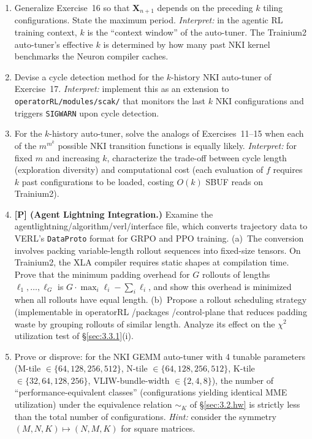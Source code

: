 \documentclass[12pt]{article}
\newcommand{\SBUF}{\textsc{SBUF}}                 %
\newcommand{\MME}{\textsc{MME}}                   %
\begin{document}
\begin{enumerate}
\item[\textbf{17.}] [10] Generalize Exercise~16 so that $\mathbf{X}_{n+1}$ depends on the preceding $k$ tiling configurations. State the maximum period. \emph{Interpret:} in the agentic RL training context, $k$ is the ``context window'' of the auto-tuner. The Trainium2 auto-tuner's effective $k$ is determined by how many past NKI kernel benchmarks the Neuron compiler caches.

\item[\textbf{18.}] [$M20$] Devise a cycle detection method for the $k$-history NKI auto-tuner of Exercise~17. \emph{Interpret:} implement this as an extension to \texttt{operatorRL/modules/scak/} that monitors the last $k$ NKI configurations and triggers \texttt{SIGWARN} upon cycle detection.

\item[\textbf{19.}] [$M48$] For the $k$-history auto-tuner, solve the analogs of Exercises~11--15 when each of the $m^{m^k}$ possible NKI transition functions is equally likely. \emph{Interpret:} for fixed $m$ and increasing $k$, characterize the trade-off between cycle length (exploration diversity) and computational cost (each evaluation of $f$ requires $k$ past configurations to be loaded, costing $O(k)$ \SBUF{} reads on Trainium2).

\item[\textbf{20.}] [$HM30$] \textbf{[P] (Agent Lightning Integration.)} Examine the agentlightning/algorithm/verl/interface file, which converts trajectory data to VERL's \texttt{DataProto} format for GRPO and PPO training. (a)~The conversion involves packing variable-length rollout sequences into fixed-size tensors. On Trainium2, the XLA compiler requires static shapes at compilation time. Prove that the minimum padding overhead for $G$ rollouts of lengths $\ell_1, \ldots, \ell_G$ is $G \cdot \max_i \ell_i - \sum_i \ell_i$, and show this overhead is minimized when all rollouts have equal length. (b)~Propose a rollout scheduling strategy (implementable in operatorRL /packages /control-plane that reduces padding waste by grouping rollouts of similar length. Analyze its effect on the $\chi^2$ utilization test of \S\ref{sec:3.3.1}(i).

\item[\textbf{21.}] [$HM42$] Prove or disprove: for the NKI GEMM auto-tuner with 4 tunable parameters (M-tile $\in \{64, 128, 256, 512\}$, N-tile $\in \{64, 128, 256, 512\}$, K-tile $\in \{32, 64, 128, 256\}$, VLIW-bundle-width $\in \{2, 4, 8\}$), the number of ``performance-equivalent classes'' (configurations yielding identical \MME{} utilization) under the equivalence relation $\sim_K$ of \S\ref{sec:3.2.hw} is strictly less than the total number of configurations. \emph{Hint:} consider the symmetry $(M, N, K) \mapsto (N, M, K)$ for square matrices.


\end{enumerate}
\end{document}
